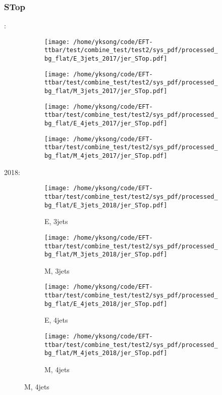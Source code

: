 \documentclass{beamer}
\begin{document}
\begin{frame}
\frametitle{STop}
\fontsize{5}{1}:
\begin{figure}
\centering
\begin{subfigure}[b]{0.24\textwidth}
\texttt{[image: /home/yksong/code/EFT-ttbar/test/combine\_test/test2/sys\_pdf/processed\_bg\_flat/E\_3jets\_2017/jer\_STop.pdf]}
\end{subfigure}
\begin{subfigure}[b]{0.24\textwidth}
\texttt{[image: /home/yksong/code/EFT-ttbar/test/combine\_test/test2/sys\_pdf/processed\_bg\_flat/M\_3jets\_2017/jer\_STop.pdf]}
\end{subfigure}
\begin{subfigure}[b]{0.24\textwidth}
\texttt{[image: /home/yksong/code/EFT-ttbar/test/combine\_test/test2/sys\_pdf/processed\_bg\_flat/E\_4jets\_2017/jer\_STop.pdf]}
\end{subfigure}
\begin{subfigure}[b]{0.24\textwidth}
\texttt{[image: /home/yksong/code/EFT-ttbar/test/combine\_test/test2/sys\_pdf/processed\_bg\_flat/M\_4jets\_2017/jer\_STop.pdf]}
\end{subfigure}
\end{figure}
2018:
\begin{figure}
\centering
\begin{subfigure}[b]{0.24\textwidth}
\texttt{[image: /home/yksong/code/EFT-ttbar/test/combine\_test/test2/sys\_pdf/processed\_bg\_flat/E\_3jets\_2018/jer\_STop.pdf]}
\captionsetup{font=tiny}
\caption{E, 3jets}
\end{subfigure}
\begin{subfigure}[b]{0.24\textwidth}
\texttt{[image: /home/yksong/code/EFT-ttbar/test/combine\_test/test2/sys\_pdf/processed\_bg\_flat/M\_3jets\_2018/jer\_STop.pdf]}
\captionsetup{font=tiny}
\caption{M, 3jets}
\end{subfigure}
\begin{subfigure}[b]{0.24\textwidth}
\texttt{[image: /home/yksong/code/EFT-ttbar/test/combine\_test/test2/sys\_pdf/processed\_bg\_flat/E\_4jets\_2018/jer\_STop.pdf]}
\captionsetup{font=tiny}
\caption{E, 4jets}
\end{subfigure}
\begin{subfigure}[b]{0.24\textwidth}
\texttt{[image: /home/yksong/code/EFT-ttbar/test/combine\_test/test2/sys\_pdf/processed\_bg\_flat/M\_4jets\_2018/jer\_STop.pdf]}
\captionsetup{font=tiny}
\caption{M, 4jets}
\end{subfigure}
\end{figure}
\end{frame}
\end{document}
